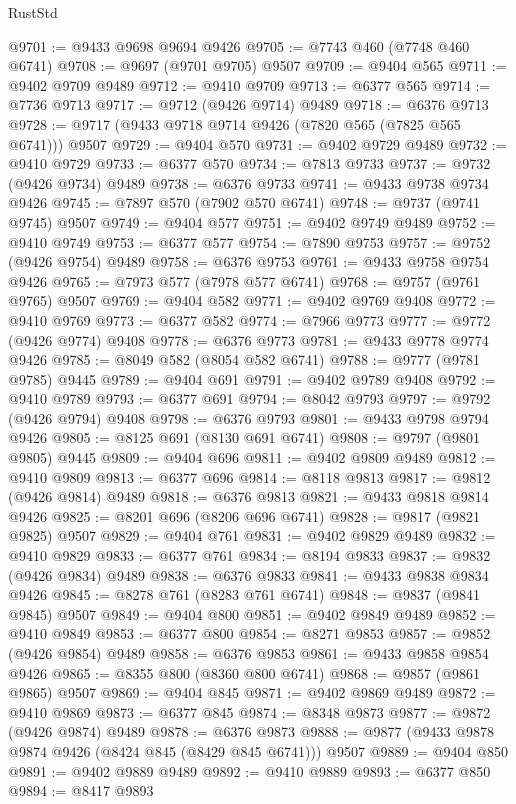 \begin{lexlean}{RustStd}
\begin{coremodule}
@9701 := @9433 @9698 @9694 @9426
@9705 := @7743 @460 (@7748 @460 @6741)
@9708 := @9697 (@9701 @9705) @9507
@9709 := @9404 @565
@9711 := @9402 @9709 @9489
@9712 := @9410 @9709
@9713 := @6377 @565
@9714 := @7736 @9713
@9717 := @9712 (@9426 @9714) @9489
@9718 := @6376 @9713
@9728 := @9717 (@9433 @9718 @9714 @9426 (@7820 @565 (@7825 @565 @6741))) @9507
@9729 := @9404 @570
@9731 := @9402 @9729 @9489
@9732 := @9410 @9729
@9733 := @6377 @570
@9734 := @7813 @9733
@9737 := @9732 (@9426 @9734) @9489
@9738 := @6376 @9733
@9741 := @9433 @9738 @9734 @9426
@9745 := @7897 @570 (@7902 @570 @6741)
@9748 := @9737 (@9741 @9745) @9507
@9749 := @9404 @577
@9751 := @9402 @9749 @9489
@9752 := @9410 @9749
@9753 := @6377 @577
@9754 := @7890 @9753
@9757 := @9752 (@9426 @9754) @9489
@9758 := @6376 @9753
@9761 := @9433 @9758 @9754 @9426
@9765 := @7973 @577 (@7978 @577 @6741)
@9768 := @9757 (@9761 @9765) @9507
@9769 := @9404 @582
@9771 := @9402 @9769 @9408
@9772 := @9410 @9769
@9773 := @6377 @582
@9774 := @7966 @9773
@9777 := @9772 (@9426 @9774) @9408
@9778 := @6376 @9773
@9781 := @9433 @9778 @9774 @9426
@9785 := @8049 @582 (@8054 @582 @6741)
@9788 := @9777 (@9781 @9785) @9445
@9789 := @9404 @691
@9791 := @9402 @9789 @9408
@9792 := @9410 @9789
@9793 := @6377 @691
@9794 := @8042 @9793
@9797 := @9792 (@9426 @9794) @9408
@9798 := @6376 @9793
@9801 := @9433 @9798 @9794 @9426
@9805 := @8125 @691 (@8130 @691 @6741)
@9808 := @9797 (@9801 @9805) @9445
@9809 := @9404 @696
@9811 := @9402 @9809 @9489
@9812 := @9410 @9809
@9813 := @6377 @696
@9814 := @8118 @9813
@9817 := @9812 (@9426 @9814) @9489
@9818 := @6376 @9813
@9821 := @9433 @9818 @9814 @9426
@9825 := @8201 @696 (@8206 @696 @6741)
@9828 := @9817 (@9821 @9825) @9507
@9829 := @9404 @761
@9831 := @9402 @9829 @9489
@9832 := @9410 @9829
@9833 := @6377 @761
@9834 := @8194 @9833
@9837 := @9832 (@9426 @9834) @9489
@9838 := @6376 @9833
@9841 := @9433 @9838 @9834 @9426
@9845 := @8278 @761 (@8283 @761 @6741)
@9848 := @9837 (@9841 @9845) @9507
@9849 := @9404 @800
@9851 := @9402 @9849 @9489
@9852 := @9410 @9849
@9853 := @6377 @800
@9854 := @8271 @9853
@9857 := @9852 (@9426 @9854) @9489
@9858 := @6376 @9853
@9861 := @9433 @9858 @9854 @9426
@9865 := @8355 @800 (@8360 @800 @6741)
@9868 := @9857 (@9861 @9865) @9507
@9869 := @9404 @845
@9871 := @9402 @9869 @9489
@9872 := @9410 @9869
@9873 := @6377 @845
@9874 := @8348 @9873
@9877 := @9872 (@9426 @9874) @9489
@9878 := @6376 @9873
@9888 := @9877 (@9433 @9878 @9874 @9426 (@8424 @845 (@8429 @845 @6741))) @9507
@9889 := @9404 @850
@9891 := @9402 @9889 @9489
@9892 := @9410 @9889
@9893 := @6377 @850
@9894 := @8417 @9893

\end{coremodule}
\end{lexlean}
